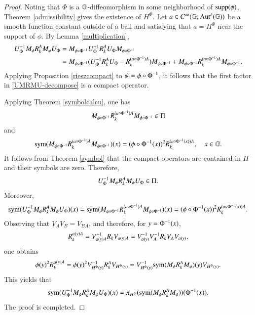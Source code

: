 \documentclass[leqno]{amsart}
\begin{document}
	\begin{proof}
		Noting that $\Phi$ is a $\mathbb{G}$-diffeomorphism in some neighborhood of ${\rm supp}(\phi)$,  Theorem \ref{admissibility} gives the existence of $H^{\Phi}$. Let $a\in C^{\infty}(\mathbb{G};{\rm Aut^{\delta}}(\mathbb{G}))$ be a smooth function constant outside of a ball and satisfying that $a=H^{\Phi}$ near the support of $\phi$.
		By  Lemma \ref{multiplication}, 
		\begin{align}\label{UMRMU-decompose}
			\nonumber U_{\Phi}^{-1} M_{\phi}{ R}^{A}_{k}M_{\phi}U_{\Phi}
			&=M_{\phi\circ\Phi^{-1}} U_{\Phi}^{-1} { R}^{A}_{k}U_{\Phi} M_{\phi\circ\Phi^{-1}}\\
			&=M_{\phi\circ\Phi^{-1}} (U_{\Phi}^{-1} { R}^{A}_{k}U_{\Phi}-{ R}^{(a\circ\Phi^{-1})A}_{k}) M_{\phi\circ\Phi^{-1}}
			+M_{\phi\circ\Phi^{-1}} { R}^{(a\circ\Phi^{-1})A}_{k} M_{\phi\circ\Phi^{-1}}.
		\end{align}
		Applying  Proposition \ref{rieszcompact} to $\psi=\phi\circ\Phi^{-1}$, it follows that the first factor in \eqref{UMRMU-decompose} is a compact operator.
		
		
		Applying Theorem \ref{symbolcalcu}, one has
		\begin{align*}
			M_{\phi\circ\Phi^{-1}} { R}^{(a\circ\Phi^{-1})A}_{k} M_{\phi\circ\Phi^{-1}}\in\Pi
		\end{align*}
		and
		\begin{align*}
			{\rm sym}(M_{\phi\circ\Phi^{-1}} { R}^{(a\circ\Phi^{-1})A}_{k} M_{\phi\circ\Phi^{-1}})(x)
			=(\phi\circ\Phi^{-1}(x))^{2}{ R}^{(a\circ\Phi^{-1}(x))A}_{k},\quad x\in \mathbb{G}.
		\end{align*}
		It follows from Theorem \ref{symbol} that the compact operators are contained in $\Pi$ and their symbols are zero. 
		Therefore, $$U_{\Phi}^{-1} M_{\phi}{ R}^{A}_{k}M_{\phi}U_{\Phi}\in\Pi.$$ 
		Moreover,
		\begin{align*}
			{\rm sym}(U_{\Phi}^{-1} M_{\phi}{ R}^{A}_{k}M_{\phi}U_{\Phi})(x)
			={\rm sym}(M_{\phi\circ\Phi^{-1}} { R}^{(a\circ\Phi^{-1})A}_{k} M_{\phi\circ\Phi^{-1}})(x)
			=(\phi\circ\Phi^{-1}(x))^{2}{ R}^{(a\circ\Phi^{-1}(x))A}_{k}.
		\end{align*}
		Observing that $V_{A}V_{B}=V_{BA}$, and therefore, for $y=\Phi^{-1}(x)$,
		\begin{align*}
			{ R}^{a(y)A}_{k}
			=V_{a(y)A}^{-1} R_{k} V_{a(y)A}
			=V_{a(y)}^{-1} V_{A}^{-1} R_{k} V_{A}V_{a(y)},
		\end{align*}
		one obtains
		\begin{align*}
			\phi(y)^{2}{ R}^{a(y)A}_{k}
			=\phi(y)^{2}V_{H^{\Phi}(y)}^{-1} { R}^{A}_{k}V_{H^{\Phi}(y)}
			=V_{H^{\Phi}(y)}^{-1}{\rm sym}(M_{\phi}{ R}^{A}_{k}M_{\phi})(y)V_{H^{\Phi}(y)}.
		\end{align*}
		This yields that
		\begin{align*}
			{\rm sym}(U_{\Phi}^{-1} M_{\phi}{ R}^{A}_{k}M_{\phi}U_{\Phi})(x)
			=\pi_{H^{\Phi}}({\rm sym}(M_{\phi}{ R}^{A}_{k}M_{\phi}))(\Phi^{-1}(x)).
		\end{align*}
		The proof is completed.
		
	\end{proof}
	
\end{document}
